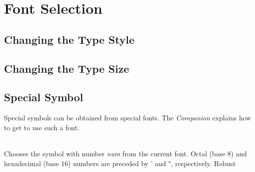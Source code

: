 \section{Font Selection}
\subsection{Changing the Type Style}


\subsection{Changing the Type Size}


\subsection{Special Symbol}
Special symbols can be obtained from special fonts. The \ltx{} \textit{Companion}
explains how to get \ltx{} to use such a font.

\noindent{}\\
Chooses the symbol with number \textit{num} from the current font. Octal (base 8) and
hexadecimal (base 16) numbers are preceded by ' and ", respectively. Robust
\newpage